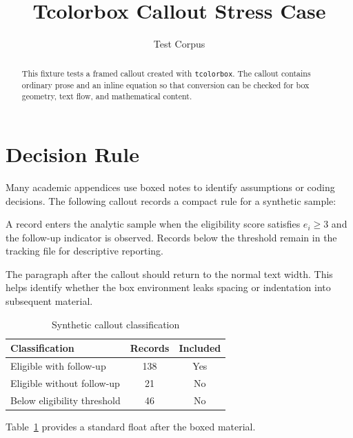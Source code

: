 \documentclass[11pt]{article}
\title{Tcolorbox Callout Stress Case}
\author{Test Corpus}
\date{}
\begin{document}
\maketitle

\begin{abstract}
This fixture tests a framed callout created with \texttt{tcolorbox}. The callout
contains ordinary prose and an inline equation so that conversion can be checked
for box geometry, text flow, and mathematical content.
\end{abstract}

\section{Decision Rule}
\label{sec:decision-rule}

Many academic appendices use boxed notes to identify assumptions or coding
decisions. The following callout records a compact rule for a synthetic sample:

\begin{tcolorbox}[
  title={Coding rule},
  colback=gray!6,
  colframe=black!65,
  boxrule=0.6pt,
  arc=1mm,
  left=6pt,
  right=6pt,
  top=6pt,
  bottom=6pt
]
A record enters the analytic sample when the eligibility score satisfies
$e_i \geq 3$ and the follow-up indicator is observed. Records below the threshold
remain in the tracking file for descriptive reporting.
\end{tcolorbox}

The paragraph after the callout should return to the normal text width. This
helps identify whether the box environment leaks spacing or indentation into
subsequent material.

\begin{table}[htbp]
\centering
\caption{Synthetic callout classification}
\label{tab:callout}
\begin{tabular}{lcc}
\toprule
Classification & Records & Included \\
\midrule
Eligible with follow-up & 138 & Yes \\
Eligible without follow-up & 21 & No \\
Below eligibility threshold & 46 & No \\
\bottomrule
\end{tabular}
\end{table}

Table~\ref{tab:callout} provides a standard float after the boxed material.
\end{document}
